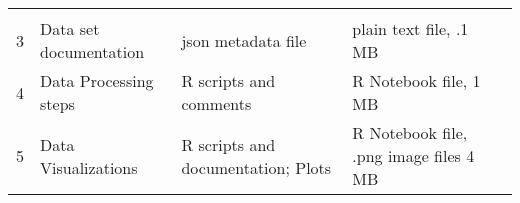 \documentclass[]{article}
\begin{document}
\begin{longtable}[]{@{}cllll@{}}
\begin{minipage}[t]{0.18\columnwidth}
\strut
\end{minipage}\tabularnewline
\begin{minipage}[t]{0.11\columnwidth}\centering\strut
3\strut
\end{minipage} & \begin{minipage}[t]{0.11\columnwidth}\raggedright\strut
Data set documentation\strut
\end{minipage} & \begin{minipage}[t]{0.16\columnwidth}\raggedright\strut
json metadata file\strut
\end{minipage} & \begin{minipage}[t]{0.14\columnwidth}\raggedright\strut
plain text file, .1 MB\strut
\end{minipage} & \begin{minipage}[t]{0.18\columnwidth}\raggedright\strut
\strut
\end{minipage}\tabularnewline
\begin{minipage}[t]{0.11\columnwidth}\centering\strut
4\strut
\end{minipage} & \begin{minipage}[t]{0.11\columnwidth}\raggedright\strut
Data Processing steps\strut
\end{minipage} & \begin{minipage}[t]{0.16\columnwidth}\raggedright\strut
R scripts and comments\strut
\end{minipage} & \begin{minipage}[t]{0.14\columnwidth}\raggedright\strut
R Notebook file, 1 MB\strut
\end{minipage} & \begin{minipage}[t]{0.18\columnwidth}\raggedright\strut
\strut
\end{minipage}\tabularnewline
\begin{minipage}[t]{0.11\columnwidth}\centering\strut
5\strut
\end{minipage} & \begin{minipage}[t]{0.11\columnwidth}\raggedright\strut
Data Visualizations\strut
\end{minipage} & \begin{minipage}[t]{0.16\columnwidth}\raggedright\strut
R scripts and documentation; Plots\strut
\end{minipage} & \begin{minipage}[t]{0.14\columnwidth}\raggedright\strut
R Notebook file, .png image files 4 MB\strut
\end{minipage} & \begin{minipage}[t]{0.18\columnwidth}\raggedright\strut

\end{minipage}
\end{longtable}
\end{document}
